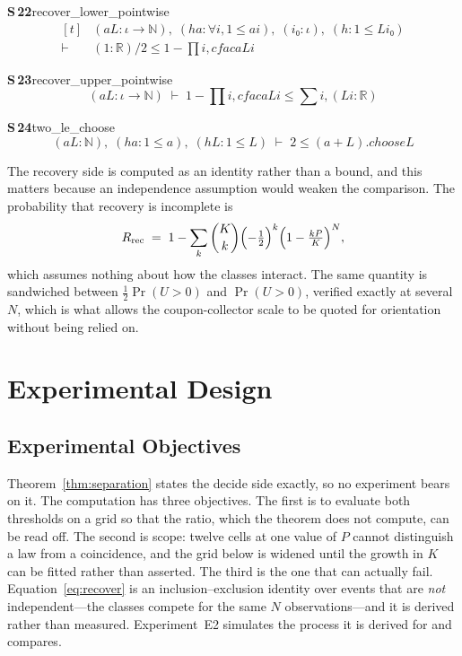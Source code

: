 \documentclass[conference]{IEEEtran}
\theoremstyle{definition}
\newcommand{\lean}[1]{\textsf{\footnotesize #1}}
\begin{document}
\noindent\textbf{S\,22}\quad\lean{recover\_lower\_pointwise}
{\footnotesize\[ \begin{aligned}[t]
&(\mathit{a} \mathit{L} : \iota \to \mathbb{N} ),\; (\mathit{ha} : \forall \mathit{i}, 1 \leq \mathit{a} \mathit{i}),\; (\mathit{i₀} : \iota ),\; (\mathit{h} : 1 \leq \mathit{L} \mathit{i₀})\\
\vdash\;&(1:\mathbb{R} ) / 2 \leq 1 - \textstyle\prod \mathit{i}, \mathit{cfac} \mathit{a} \mathit{L} \mathit{i}
\end{aligned} \]}

\noindent\textbf{S\,23}\quad\lean{recover\_upper\_pointwise}
{\footnotesize\[ (\mathit{a} \mathit{L} : \iota \to \mathbb{N} ) \;\vdash\; 1 - \textstyle\prod \mathit{i}, \mathit{cfac} \mathit{a} \mathit{L} \mathit{i} \leq \textstyle\sum \mathit{i}, (\mathit{L} \mathit{i} : \mathbb{R} ) \]}

\noindent\textbf{S\,24}\quad\lean{two\_le\_choose}
{\footnotesize\[ (\mathit{a} \mathit{L} : \mathbb{N} ),\; (\mathit{ha} : 1 \leq \mathit{a}),\; (\mathit{hL} : 1 \leq \mathit{L}) \;\vdash\; 2 \leq (\mathit{a} + \mathit{L}).\mathit{choose} \mathit{L} \]}


The recovery side is computed as an identity rather than a bound, and this matters because an
independence assumption would weaken the comparison. The probability that recovery is
incomplete is
\begin{equation}
R_{\mathrm{rec}}
\;=\;1-\sum_{k}\binom{K}{k}\Bigl(-\tfrac12\Bigr)^{k}
     \Bigl(1-\tfrac{kP}{K}\Bigr)^{N},
\label{eq:recover}
\end{equation}
which assumes nothing about how the classes interact. The same quantity is sandwiched between
$\tfrac12\Pr(U>0)$ and $\Pr(U>0)$, verified exactly at several $N$, which is what allows the
coupon-collector scale to be quoted for orientation without being relied on.

\section{Experimental Design}
\label{sec:expdesign}

\subsection{Experimental Objectives}

Theorem~\ref{thm:separation} states the decide side exactly, so no experiment bears on it. The
computation has three objectives. The first is to evaluate both thresholds on a grid so that
the ratio, which the theorem does not compute, can be read off. The second is scope: twelve
cells at one value of $P$ cannot distinguish a law from a coincidence, and the grid below is
widened until the growth in $K$ can be fitted rather than asserted. The third is the one that
can actually fail. Equation~\eqref{eq:recover} is an inclusion--exclusion identity over events
that are \emph{not} independent---the classes compete for the same $N$ observations---and it
is derived rather than measured. Experiment~E2 simulates the process it is derived for and
compares.
\end{document}
